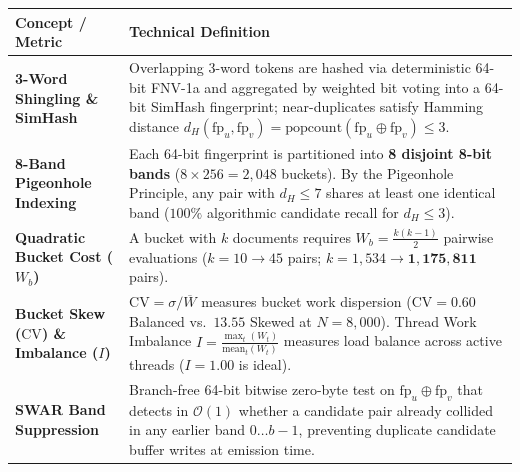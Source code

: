 \documentclass[10pt,a4paper]{article}
\renewcommand{\_}{\textunderscore\allowbreak}
\begin{document}
\begingroup
\footnotesize
\renewcommand{\arraystretch}{1.18}
\begin{tabular}{@{} >{\raggedright\arraybackslash\bfseries\color{primaryblue}}p{} L{0.73\textwidth} @{}}
    \toprule
    \textbf{Concept / Metric} & \textbf{Technical Definition} \\
    -Word Shingling \& SimHash & Overlapping 3-word tokens are hashed via deterministic 64-bit FNV-1a and aggregated by weighted bit voting into a 64-bit SimHash fingerprint; near-duplicates satisfy Hamming distance $d_H(\text{fp}_u, \text{fp}_v) = \text{popcount}(\text{fp}_u \oplus \text{fp}_v) \le 3$. \\
    8-Band Pigeonhole Indexing & Each 64-bit fingerprint is partitioned into \textbf{8 disjoint 8-bit bands} ($8 \times 256 = 2,048$ buckets). By the Pigeonhole Principle, any pair with $d_H \le 7$ shares at least one identical band ($100\%$ algorithmic candidate recall for $d_H \le 3$). \\
    Quadratic Bucket Cost ($W_b$) & A bucket with $k$ documents requires $W_b = \frac{k(k-1)}{2}$ pairwise evaluations ($k=10 \to 45$ pairs; $k=1,534 \to \mathbf{1,175,811}$ pairs). \\
    Bucket Skew ($\text{CV}$) \& Imbalance ($I$) & $\text{CV} = \sigma / \overline{W}$ measures bucket work dispersion ($\text{CV} = 0.60$ Balanced vs.\ $\mathbf{13.55}$ Skewed at $N=8,000$). Thread Work Imbalance $I = \frac{\max_t(W_t)}{\text{mean}_t(W_t)}$ measures load balance across active threads ($I = 1.00$ is ideal). \\
    SWAR Band Suppression & Branch-free 64-bit bitwise zero-byte test on $\text{fp}_u \oplus \text{fp}_v$ that detects in $\mathcal{O}(1)$ whether a candidate pair already collided in any earlier band $0 \dots b-1$, preventing duplicate candidate buffer writes at emission time. \\
    \bottomrule
\end{tabular}
\endgroup

\vspace{0.2em}
\begin{center}
\end{center}
\end{document}
